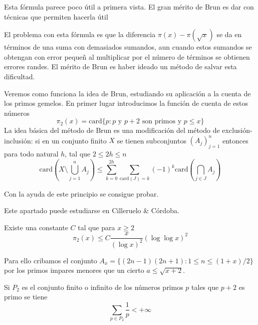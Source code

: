 \documentclass[TAN.tex]{subfiles}
\begin{document}
Esta fórmula parece poco útil a primera vista. El gran mérito de Brun es dar con técnicas que permiten hacerla útil

El problema con esta fórmula es que la diferencia $π(x)-π(\sqrt{x})$ se da en términos de una suma con demasiados sumandos, aun cuando estos sumandos se obtengan con error pequeñ al multiplicar por el número de términos se obtienen errores randes. El mérito de Brun es haber ideado un método de salvar esta dificultad.

Veremos como funciona la idea de Brun, estudiando su aplicación a la cuenta de los primos gemelos. En primer lugar introducimos la función de cuenta de estos números
\[ π_2(x) = \text{card}\{p : p \text{ y }p+2\text{ son primos y }p≤x\} \]
La idea básica del método de Brun es una modificación del método de exclusión-inclusión: si en un conjunto finito $X$ se tienen subconjuntos $(A_j)_{j=1}^n$ entonces para todo natural $h$, tal que $2≤2h≤n$
\[ \text{card}\left(X \setminus \bigcup_{j=1}^n A_j \right) ≤ \sum_{k=0}^{2h} \sum_{\text{card}(J)=k} (-1)^k \text{card}\left(\bigcap_{j\in J} A_j \right)\]

Con la ayuda de este principio se consigue probar.

Este apartado puede estudiarse en Cilleruelo \& Córdoba.

\begin{teorema}
Existe una constante $C$ tal que para $x ≥ 2$
\[ π_2(x) ≤ C \frac{x}{(\log x)^2} (\log \log x)^2 \]
\end{teorema}
Para ello cribamos el conjunto $A_x = \{(2n-1)(2n+1) : 1 ≤ n ≤ (1+x)/2\}$
por los primos impares menores que un cierto $a ≤ \sqrt{x+2}$.

\begin{coro}
Si $P_2$ es el conjunto finito o infinito de los números primos $p$ tales que $p+2$ es primo se tiene
\[ \sum_{p\in P_2} \frac{1}{p} < +∞ \]
\end{coro}
\end{document}
